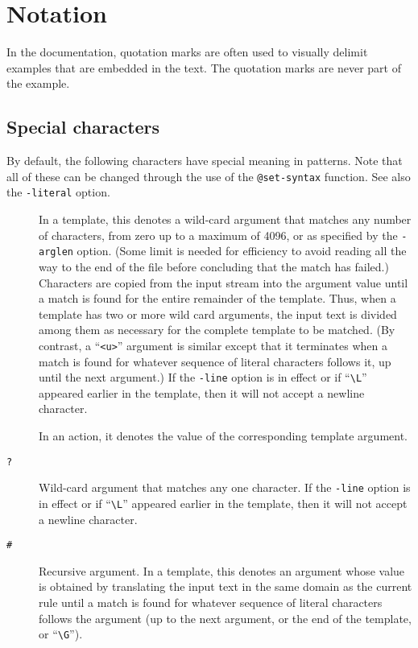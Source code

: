 
\section{Notation}

In the documentation, quotation marks are often used to visually delimit
examples that are embedded in the text.  The quotation marks are never part
of the example.

\subsection{Special characters}
By default, the following characters have special meaning in patterns.
Note that all of these can be changed through the use of the
\verb/@set-syntax/ function.  See also the \verb/-literal/ option.

\begin{description}
\item[{\tt *}]
In a template, this denotes a wild-card argument that matches any number
of characters, from zero up to a maximum of 4096, or as specified by the
\verb/-arglen/ option.  (Some limit is needed for efficiency to avoid
reading all the way to the end of the file before concluding that the match
has failed.)
Characters are copied from the input stream into the argument value
until a match is found for the entire remainder of the template.
Thus, when a template has two or more wild card arguments, the input text is
divided among them as necessary for the complete template to be matched.
(By contrast, a ``\verb/<u>/'' argument is similar except that it
terminates when a match is found for whatever sequence of literal
characters follows it, up until the next argument.)
If the \verb/-line/ option is in effect or if ``\verb/\L/'' appeared
earlier in the template, then it will not accept a newline character.

In an action, it denotes the value of the corresponding
template argument.
\item[{\tt ?}]
Wild-card argument that matches any one character.
If the \verb/-line/ option is in effect or if ``\verb/\L/'' appeared
earlier in the template, then it will not accept a newline character.
\item[{\tt \#}]
Recursive argument.
In a template, this denotes an argument whose value is obtained by
translating the input text in the same domain as the current rule until
a match is found for whatever sequence of literal characters follows the
argument (up to the next argument, or the end of the template, or
``\verb/\G/'').


\end{description}
